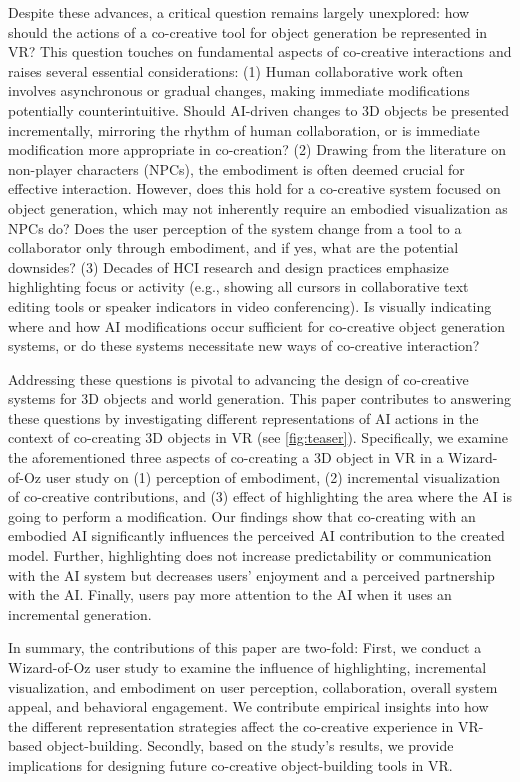 Despite these advances, a critical question remains largely unexplored: how should the actions of a co-creative tool for object generation be represented in VR? 
This question touches on fundamental aspects of co-creative interactions and raises several essential considerations:
(1) Human collaborative work often involves asynchronous or gradual changes, making immediate modifications potentially counterintuitive. Should AI-driven changes to 3D objects be presented incrementally, mirroring the rhythm of human collaboration, or is immediate modification more appropriate in co-creation?
(2) Drawing from the literature on non-player characters (NPCs), the embodiment is often deemed crucial for effective interaction. However, does this hold for a co-creative system focused on object generation, which may not inherently require an embodied visualization as NPCs do? Does the user perception of the system change from a tool to a collaborator only through embodiment, and if yes, what are the potential downsides?
(3) Decades of HCI research and design practices emphasize highlighting focus or activity (e.g., showing all cursors in collaborative text editing tools or speaker indicators in video conferencing). 
Is visually indicating where and how AI modifications occur sufficient for co-creative object generation systems, or do these systems necessitate new ways of co-creative interaction?





Addressing these questions is pivotal to advancing the design of co-creative systems for 3D objects and world generation.
This paper contributes to answering these questions by investigating different representations of AI actions in the context of co-creating 3D objects in VR (see \autoref{fig:teaser}).
Specifically, we examine the aforementioned three aspects of co-creating a 3D object in VR in a Wizard-of-Oz user study on (1) perception of embodiment, (2) incremental visualization of co-creative contributions, and (3) effect of highlighting the area where the AI is going to perform a modification. 
Our findings show that co-creating with an embodied AI significantly influences the perceived AI contribution to the created model. Further, highlighting does not increase predictability or communication with the AI system but decreases users' enjoyment and a perceived partnership with the AI. Finally, users pay more attention to the AI when it uses an incremental generation.

In summary, the contributions of this paper are two-fold:
First, we conduct a Wizard-of-Oz user study to examine the influence of highlighting, incremental visualization, and embodiment on user perception, collaboration, overall system appeal, and behavioral engagement. We contribute empirical insights into how the different representation strategies affect the co-creative experience in VR-based object-building.
Secondly, based on the study's results, we provide implications for designing future co-creative object-building tools in VR.







